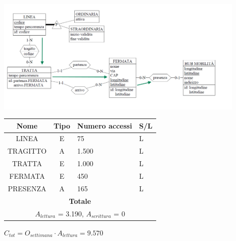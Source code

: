 \documentclass[12pt,a4paper]{report}
\begin{document}
\begin{enumerate}[label=\textbf{\arabic*)}]
    \begin{center}
    \includegraphics[width=0.9\textwidth]{VisualLineeMaggiorHub}
    \end{center}
    \begin{table}[H]
    \centering
    \begin{tabular}{|c|c|l|l|}
    \hline
    \textbf{Nome} & \textbf{Tipo} & \textbf{Numero accessi} & \textbf{S/L} \\
    \hline
    LINEA & E & 75 & L \\
    \hline
    TRAGITTO & A & 1.500 & L \\
    \hline
    TRATTA & E & 1.000 & L \\
    \hline
    FERMATA & E & 450 & L \\
    \hline
    PRESENZA & A & 165 & L \\
    \hline
    \multicolumn{4}{c}{\textbf{Totale}} \\
    \multicolumn{4}{c}{${A_{lettura}}$ = 3.190, ${A_{scrittura}}$ = 0} \\
    \hline
    \end{tabular}
    \end{table}
    \begin{center}
    ${C_{tot} = {O_{settimana}}\cdot{A_{lettura}}= 9.570}$
    \end{center}



\end{enumerate}
\end{document}

